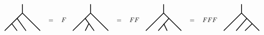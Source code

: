 \documentclass[report,paper=a4, fontsize=12pt, line_length=16cm, number_of_lines=33,dvipdfmx]{jlreq}
\numberwithin{equation}{chapter}
\begin{document}
\begin{align}
    \begin{tikzpicture}[baseline=0]
        \draw[very thick](0.5,0.5)--(-0.5,-0.5);
        \draw[very thick](-0.1, -0.1)--(0.2,-0.5);
        \draw[very thick](0.2, 0.2)--(0.7,-0.5);
        \draw[very thick](0.5,0.5)--(1.5,-0.5);
        \draw[very thick](0.5,0.5)--(0.5,1);
    \end{tikzpicture}
    \quad = \quad
    F
    \quad
    \begin{tikzpicture}[baseline=0]
        \draw[very thick](0.5,0.5)--(-0.5,-0.5);
        \draw[very thick](0.4, -0.1)--(0.2,-0.5);
        \draw[very thick](0.2, 0.2)--(0.7,-0.5);
        \draw[very thick](0.5,0.5)--(1.5,-0.5);
        \draw[very thick](0.5,0.5)--(0.5,1);
    \end{tikzpicture}
    \quad = \quad
    FF\quad
    \begin{tikzpicture}[baseline=0]
        \draw[very thick](0.5,0.5)--(-0.5,-0.5);
        \draw[very thick](0.8, 0.2)--(0.2,-0.5);
        \draw[very thick](0.51, -0.1)--(0.7,-0.5);
        \draw[very thick](0.5,0.5)--(1.5,-0.5);
        \draw[very thick](0.5,0.5)--(0.5,1);
    \end{tikzpicture}
    \quad = \quad
    FFF\quad
    \begin{tikzpicture}[baseline=0]
        \draw[very thick](0.5,0.5)--(-0.5,-0.5);
        \draw[very thick](0.8, 0.2)--(0.2,-0.5);
        \draw[very thick](1.1, -0.1)--(0.7,-0.5);
        \draw[very thick](0.5,0.5)--(1.5,-0.5);
        \draw[very thick](0.5,0.5)--(0.5,1);
    \end{tikzpicture}
\end{align}
\end{document}
